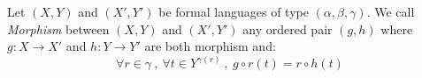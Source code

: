 \begin{defin}\label{logic:def:morphism:FL}
Let $(X,Y)$ and $(X',Y')$ be formal languages of type
$(\alpha,\beta,\gamma)$. We call {\em Morphism} between $(X,Y)$ and
$(X',Y')$ any ordered pair $(g,h)$ where $g:X\rightarrow X'$ and
$h:Y\rightarrow Y'$ are both morphism and:
    \[
    \forall r\in\gamma\ ,\ \forall t\in Y^{\gamma(r)}\ ,\
    g\circ r(t) = r\circ h(t)
    \]
\end{defin}
